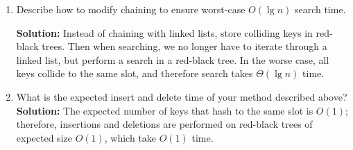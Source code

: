 \documentclass[letterpaper,11pt]{article}
\begin{document}
\begin{enumerate}
\item Describe how to modify chaining to ensure worst-case $O(\lg n)$ search time.

\textbf{Solution:} Instead of chaining with linked lists, store colliding keys in red-black trees. Then when searching, we no longer have to iterate through a linked list, but perform a search in a red-black tree. In the worse case, all keys collide to the same slot, and therefore search takes $\Theta(\lg n)$ time. 

\item What is the expected insert and delete time of your method described above?\\

\textbf{Solution:} The expected number of keys that hash to the same slot is $O(1)$; therefore, insertions and deletions are performed on red-black trees of expected size $O(1)$, which take $O(1)$ time.


\end{enumerate}
\end{document}
